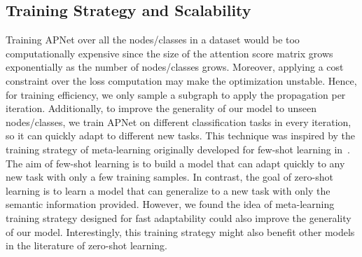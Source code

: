 \documentclass[letterpaper]{article} %
\begin{document}
\subsection{Training Strategy and Scalability}
Training APNet over all the nodes/classes in a dataset would be too computationally expensive since the size of the attention score matrix grows exponentially as the number of nodes/classes grows. Moreover, applying a cost constraint over the loss computation may make the optimization unstable. Hence, for training efficiency, we only sample a subgraph to apply the propagation per iteration. Additionally, to improve the generality of our model to unseen nodes/classes, we train APNet on different classification tasks in every iteration, so it can quickly adapt to different new tasks. This technique was inspired by the training strategy of meta-learning originally developed for few-shot learning in~\cite{vinyals2016matching}. The aim of few-shot learning is to build a model that can adapt quickly to any new task with only a few training samples. In contrast, the goal of zero-shot learning is to learn a model that can generalize to a new task with only the semantic information provided. However, we found the idea of meta-learning training strategy designed for fast adaptability could also improve the generality of our model. Interestingly, this training strategy might also benefit other models in the literature of zero-shot learning.




\end{document}

